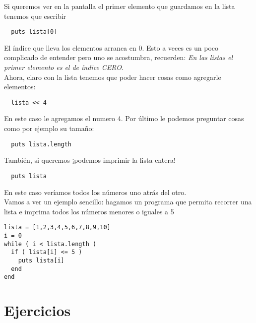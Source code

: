Si queremos ver en la pantalla el primer elemento que guardamos en la lista tenemos que escribir
\begin{lstlisting}
  puts lista[0]
\end{lstlisting}

El índice que lleva los elementos arranca en 0. Esto a veces es un poco complicado de entender pero uno se acostumbra, recuerden: \emph{En las listas el primer elemento es el de índice CERO}.\\

Ahora, claro con la lista tenemos que poder hacer cosas como agregarle elementos:
\begin{lstlisting}
  lista << 4
\end{lstlisting}

En este caso le agregamos el numero 4. Por último le podemos preguntar cosas como por ejemplo su tamaño:
\begin{lstlisting}
  puts lista.length
\end{lstlisting}

También, si queremos ¡podemos imprimir la lista entera!
\begin{lstlisting}
  puts lista
\end{lstlisting}

En este caso veríamos todos los números uno atrás del otro.\\

Vamos a ver un ejemplo sencillo: hagamos un programa que permita recorrer una lista e imprima todos los números menores o iguales a 5 

\begin{lstlisting}
lista = [1,2,3,4,5,6,7,8,9,10]
i = 0
while ( i < lista.length )
  if ( lista[i] <= 5 )
    puts lista[i]
  end
end
\end{lstlisting}

\section{Ejercicios}
